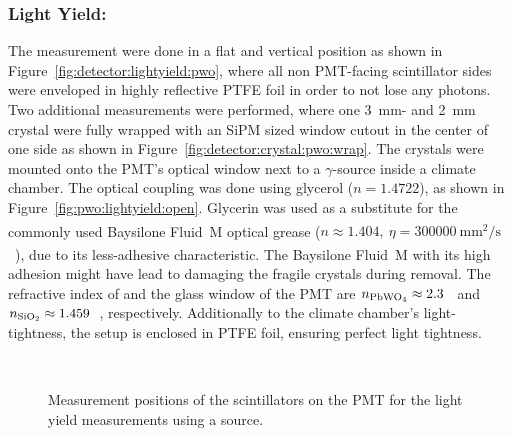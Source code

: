 \subsubsection{Light Yield: }
The  measurement were done in a flat and vertical position as shown in Figure~\ref{fig:detector:lightyield:pwo}, where all non PMT-facing scintillator sides were enveloped in highly reflective PTFE foil in order to not lose any photons.
Two additional measurements were performed, where one \SI{3}{\milli\meter}- and \SI{2}{\milli\meter} crystal were fully wrapped with an SiPM sized window cutout in the center of one side  as shown in Figure~\ref{fig:detector:crystal:pwo:wrap}.
The  crystals were mounted onto the PMT's optical window next to a  $\gamma$-source inside a climate chamber.
The optical coupling was done using glycerol ($n=1.4722$), as shown in Figure~\ref{fig:pwo:lightyield:open}.
Glycerin was used as a substitute for the commonly used Baysilone\textsuperscript{{\textregistered}} Fluid~M optical grease ($n\approx 1.404,~\eta=\SI{300000}{\milli\meter^2\per\second}$~\cite{bayer:baysilone}), due to its less-adhesive characteristic.
The Baysilone\textsuperscript{{\textregistered}} Fluid~M with its high adhesion might have lead to damaging the fragile crystals during removal.
The refractive index of  and the  glass window of the \gls{PMT} are $n_{\ce{PbWO4}}\approx2.3$~\cite{cms:tdr} and $n_{\ce{SiO2}}\approx1.459$~\cite{Malitson:65}, respectively.
Additionally to the climate chamber's light-tightness, the setup is enclosed in PTFE foil, ensuring perfect light tightness.

\begin{figure}[h]
    \centering        
    \hspace{0.02\textwidth}
    \\ 
    \caption{Measurement positions of the  scintillators on the \gls{PMT} for the light yield measurements using a  source.}\label{fig:lightyield:pwo:setup}
\end{figure}


